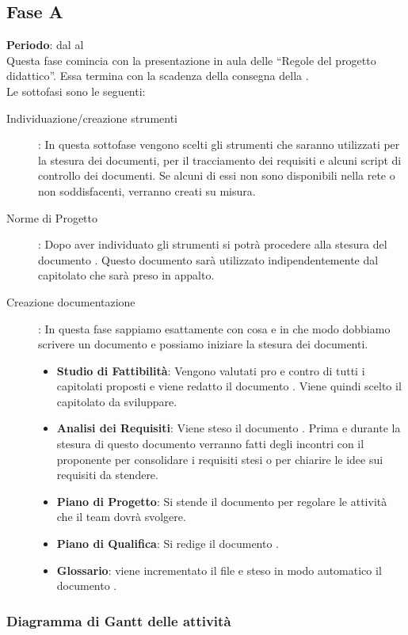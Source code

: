 \subsection{Fase A}
	\textbf{Periodo}: dal  al  \\
	Questa fase comincia con la presentazione in aula delle “Regole del progetto didattico”. Essa termina con la scadenza della consegna della .\\Le sottofasi sono le seguenti:
	\begin{description}
		\item[Individuazione/creazione strumenti]: In questa sottofase vengono scelti gli strumenti che saranno utilizzati per la stesura dei documenti, per il tracciamento dei requisiti e alcuni script di controllo dei documenti. Se alcuni di essi non sono disponibili nella rete o non soddisfacenti, verranno creati su misura.
		\item[Norme di Progetto]: Dopo aver individuato gli strumenti si potrà procedere alla stesura del documento . Questo documento sarà utilizzato indipendentemente dal capitolato che sarà preso in appalto.
		\item[Creazione documentazione]: In questa fase sappiamo esattamente con cosa e in che modo dobbiamo scrivere un documento e possiamo iniziare la stesura dei documenti.
			\begin{itemize}
				\item \textbf{Studio di Fattibilità}: Vengono valutati pro e contro di tutti i capitolati proposti e viene redatto il documento . Viene quindi scelto il capitolato da sviluppare.
				\item \textbf{Analisi dei Requisiti}: Viene steso il documento . Prima e durante la stesura di questo documento verranno fatti degli incontri con il proponente per consolidare i requisiti stesi o per chiarire le idee sui requisiti da stendere.
				\item \textbf{Piano di Progetto}: Si stende il documento  per regolare le attività che il team dovrà svolgere.
				\item \textbf{Piano di Qualifica}: Si redige il documento .
				\item \textbf{Glossario}: viene incrementato il file   e steso in modo automatico il documento .
			\end{itemize}
	\end{description}
	\subsubsection{Diagramma di Gantt delle attività}
